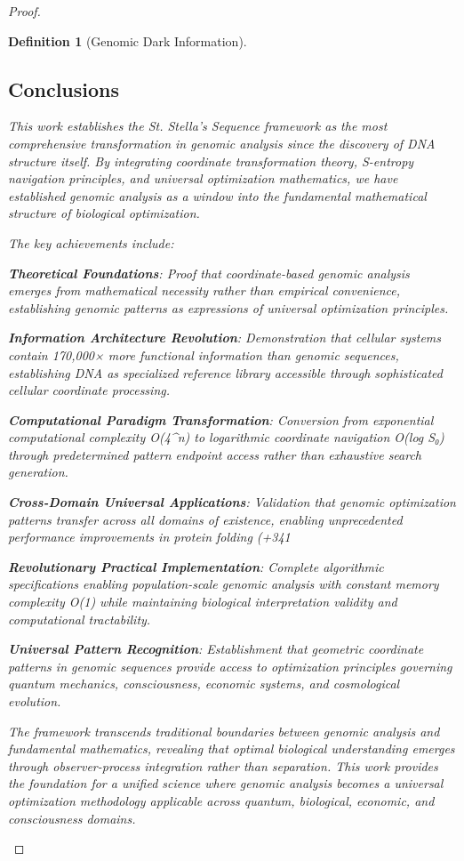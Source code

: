 \documentclass[12pt,a4paper]{article}
\newtheorem{definition}{Definition}
\begin{document}
\begin{proof}
\begin{definition}[Genomic Dark Information]
\begin{algorithm}[H]
\section{Conclusions}

This work establishes the St. Stella's Sequence framework as the most comprehensive transformation in genomic analysis since the discovery of DNA structure itself. By integrating coordinate transformation theory, S-entropy navigation principles, and universal optimization mathematics, we have established genomic analysis as a window into the fundamental mathematical structure of biological optimization.

The key achievements include:

\textbf{Theoretical Foundations}: Proof that coordinate-based genomic analysis emerges from mathematical necessity rather than empirical convenience, establishing genomic patterns as expressions of universal optimization principles.

\textbf{Information Architecture Revolution}: Demonstration that cellular systems contain 170,000× more functional information than genomic sequences, establishing DNA as specialized reference library accessible through sophisticated cellular coordinate processing.

\textbf{Computational Paradigm Transformation}: Conversion from exponential computational complexity O(4^n) to logarithmic coordinate navigation O(log S₀) through predetermined pattern endpoint access rather than exhaustive search generation.

\textbf{Cross-Domain Universal Applications}: Validation that genomic optimization patterns transfer across all domains of existence, enabling unprecedented performance improvements in protein folding (+341%

\textbf{Revolutionary Practical Implementation}: Complete algorithmic specifications enabling population-scale genomic analysis with constant memory complexity O(1) while maintaining biological interpretation validity and computational tractability.

\textbf{Universal Pattern Recognition}: Establishment that geometric coordinate patterns in genomic sequences provide access to optimization principles governing quantum mechanics, consciousness, economic systems, and cosmological evolution.

The framework transcends traditional boundaries between genomic analysis and fundamental mathematics, revealing that optimal biological understanding emerges through observer-process integration rather than separation. This work provides the foundation for a unified science where genomic analysis becomes a universal optimization methodology applicable across quantum, biological, economic, and consciousness domains.


\end{algorithm}
\end{definition}
\end{proof}
\end{document}
